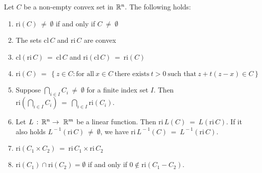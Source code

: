 \begin{proposition}
  \label{cv:primer:prop}
  Let $C$ be a non-empty convex set in $\mathbb{R}^n.$ The following holds:
\begin{enumerate}[label={(\roman*)}]
  \item
    $
      \mathrm{ri}(C)
      \ 
      \neq
      \ 
      \emptyset
      $
if and only if
      $
      C
      \ 
      \neq
      \ 
      \emptyset
    $
  \item
    The sets
    $
      \mathrm{cl}\,C
      $
      and
      $
      \mathrm{ri}\,C
    $
    are convex
  \item
    $
      \mathrm{cl}(\mathrm{ri}\,C)
      \ 
      =
      \ 
      \mathrm{cl}\,C
      $
      and
      $
      \mathrm{ri}(\mathrm{cl}\,C)
      \ 
      =
      \ 
      \mathrm{ri}(C)
    $
  \item
    $
    \mathrm{ri}(C)
      \ 
    =
      \ 
    \left\{ 
      z \in C
      \colon
      \text{for all}\ 
      x \in C \ 
      \text{there exists}\ 
      t > 0 \ 
      \text{such that}\ 
      z + t (z-x)
      \in C
    \right\}
    $
  \item
    Suppose
    $
      \bigcap_{i\in I} C_i
      \ 
      \neq
      \ 
      \emptyset
    $
    for a finite index set $I$.
    Then
    $
      \mathrm{ri}
      \left( 
        \bigcap_{i\in I} C_i
      \right)
      \ 
      =
      \ 
      \bigcap_{i\in I}  
      \mathrm{ri}(C_i)
    $.
    \item
      Let 
      $
        L\,:\,\mathbb{R}^n \to\  \mathbb{R}^m
      $
      be a linear function. Then
      $
        \mathrm{ri}\,L(C)
        \ 
        =
        \ 
        L(\mathrm{ri}\,C)
      $.
      If it also holds
      $
        L^{\!-1}(\mathrm{ri}\,C)
        \ 
        \neq
        \ 
        \emptyset
      $,
      we have
      $
      \mathrm{ri}\,L^{\!-1}(C)
      \ 
        =
      \ 
        L^{\!-1}(\mathrm{ri}\,C)
      $.
      \item
        $
          \mathrm{ri}(C_1\!\times C_2)
          \ 
          = 
          \ 
          \mathrm{ri}\,C_1
          \! 
          \times
          \mathrm{ri}\,C_2
        $
      \item
        $
          \mathrm{ri}(C_1)
          \cap
          \mathrm{ri}(C_2)
          =
          \emptyset
        $
        if and only if
        $
          0 \notin
          \mathrm{ri}
          (C_1 - C_2)
          .
        $
\end{enumerate}

\end{proposition}


